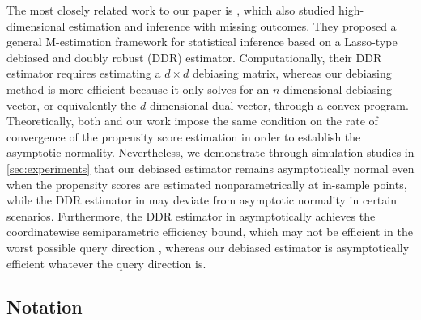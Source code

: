 \documentclass[ejsv2,noshowframe]{imsart}
\theoremstyle{plain}
\theoremstyle{definition}
\theoremstyle{remark}
\begin{document}
The most closely related work to our paper is \cite{chakrabortty2019high}, which also studied high-dimensional estimation and inference with missing outcomes. They proposed a general M-estimation framework for statistical inference based on a Lasso-type debiased and doubly robust (DDR) estimator. Computationally, their DDR estimator requires estimating a $d\times d$ debiasing matrix, whereas our debiasing method is more efficient because it only solves for an $n$-dimensional debiasing vector, or equivalently the $d$-dimensional dual vector, through a convex program. Theoretically, both \cite{chakrabortty2019high} and our work impose the same condition on the rate of convergence of the propensity score estimation in order to establish the asymptotic normality. Nevertheless, we demonstrate through simulation studies in \autoref{sec:experiments} that our debiased estimator remains asymptotically normal even when the propensity scores are estimated nonparametrically at in-sample points, while the DDR estimator in \cite{chakrabortty2019high} may deviate from asymptotic normality in certain scenarios. Furthermore, the DDR estimator in \cite{chakrabortty2019high} asymptotically achieves the coordinatewise semiparametric efficiency bound, which may not be efficient in the worst possible query direction \citep{jankova2018semiparametric}, whereas our debiased estimator is asymptotically efficient whatever the query direction is. 


\subsection{Notation}
\end{document}
